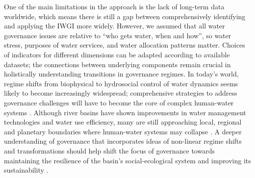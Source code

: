 One of the main limitations in the approach is the lack of long-term data worldwide, which means there is still a gap between comprehensively identifying and applying the IWGI more widely.
However, we assumed that all water governance issues are relative to ``who gets water, when and how'', so water stress, purposes of water services, and water allocation patterns matter.
Choices of indicators for different dimensions can be adapted according to available datasets; the connections between underlying components remain crucial in holistically understanding transitions in governance regimes.
In today's world, regime shifts from biophysical to hydrosocial control of water dynamics seems likely to become increasingly widespread; comprehensive strategies to address governance challenges will have to become the core of complex human-water systems
\cite{cumming2018,cumming2014,jaeger2019}.
Although river basins have shown improvements in water management technologies and water use efficiency, many are still approaching local, regional and planetary boundaries where human-water systems may collapse
\cite{gleeson2020, wang-erlandsson2022}.
A deeper understanding of governance that incorporates ideas of non-linear regime shifts and transformations should help shift the focus of governance towards maintaining the resilience of the basin’s social-ecological system and improving its sustainability
\cite{falkenmark2019}.
